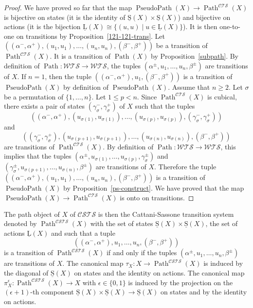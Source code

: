 \documentclass[a4paper,12pt]{amsart}
\begin{document}
\begin{proof}
We have proved so far that the map $\operatorname{{PseudoPath}}(X) \to \operatorname{{Path}}^{\mathcal{C\!T\!S}}(X)$ is
bijective on states (it is the identity of $\operatorname{\underline{S}}(X)\times \operatorname{\underline{S}}(X)$) and
bijective on actions (it is the bijection $\operatorname{\underline{L}}(X) {\cong} \{(u,u)\mid
u\in \operatorname{\underline{L}}(X)\}$). It is then one-to-one on transitions by
Proposition~\ref{121-121-trans}.  Let
$((\alpha^-,\alpha^+),(u_1,u_1),\dots,(u_n,u_n),(\beta^-,\beta^+))$ be
a transition of $\operatorname{{Path}}^{\mathcal{C\!T\!S}}(X)$. It is a transition of $\operatorname{{Path}}(X)$ by
Proposition~\ref{subpath}. By definition of $\operatorname{{Path}}:{\mathcal{W\!T\!S}} \to {\mathcal{W\!T\!S}}$,
the tuples $(\alpha^\pm,u_1,\dots,u_n,\beta^\pm)$ are transitions of
$X$. If $n=1$, then the tuple
$((\alpha^-,\alpha^+),u_1,(\beta^-,\beta^+))$ is a transition of
$\operatorname{{PseudoPath}}(X)$ by definition of $\operatorname{{PseudoPath}}(X)$. Assume that $n{\geqslant} 2$.
Let $\sigma$ be a permutation of $\{1,\dots,n\}$. Let $1{\leqslant} p <n$.
Since $\operatorname{{Path}}^{\mathcal{C\!T\!S}}(X)$ is cubical, there exists a pair of states
$(\gamma_\sigma^-,\gamma_\sigma^+)$ of $X$ such that the tuples
\[
((\alpha^-,\alpha^+),(u_{\sigma(1)},u_{\sigma(1)}),\dots,(u_{\sigma(p)},u_{\sigma(p)}),(\gamma_\sigma^-,\gamma_\sigma^+))\]
and 
\[
((\gamma_\sigma^-,\gamma_\sigma^+),(u_{\sigma(p+1)},u_{\sigma(p+1)}),\dots,(u_{\sigma(n)},u_{\sigma(n)}),(\beta^-,\beta^+))\]
are transitions of $\operatorname{{Path}}^{\mathcal{C\!T\!S}}(X)$. By definition of $\operatorname{{Path}}:{\mathcal{W\!T\!S}}\to
{\mathcal{W\!T\!S}}$, this implies that the tuples
$(\alpha^\pm,u_{\sigma(1)},\dots,u_{\sigma(p)},\gamma_\sigma^\pm)$ and
$(\gamma_\sigma^\pm,u_{\sigma(p+1)},\dots,u_{\sigma(n)},\beta^\pm)$
are transitions of $X$.  Therefore the tuple
$((\alpha^-,\alpha^+),(u_1,u_1),\dots,(u_n,u_n),(\beta^-,\beta^+))$ is
a transition of $\operatorname{{PseudoPath}}(X)$ by Proposition~\ref{ps-construct}. We
have proved that the map $\operatorname{{PseudoPath}}(X) \to \operatorname{{Path}}^{\mathcal{C\!T\!S}}(X)$ is onto on
transitions.  \end{proof}

The path object of $X$ of ${\mathcal{C\!S\!T\!S}}$ is then the Cattani-Sassone
transition system denoted by $\operatorname{{Path}}^{\mathcal{C\!S\!T\!S}}(X)$ with the set of states
$\operatorname{\underline{S}}(X)\times \operatorname{\underline{S}}(X)$, the set of actions $\operatorname{\underline{L}}(X)$ and such that a tuple
\[((\alpha^-,\alpha^+),u_1,\dots,u_n,(\beta^-,\beta^+))\] is a
transition of $\operatorname{{Path}}^{\mathcal{C\!S\!T\!S}}(X)$ if and only if the tuples
$(\alpha^\pm,u_1,\dots,u_n,\beta^\pm)$ are transitions of $X$. The
canonical map $\tau_X:X \to \operatorname{{Path}}^{\mathcal{C\!S\!T\!S}}(X)$ is induced by the
diagonal of $\operatorname{\underline{S}}(X)$ on states and the identity on actions. The
canonical map $\pi_X^\epsilon: \operatorname{{Path}}^{\mathcal{C\!S\!T\!S}}(X) \to X$ with $\epsilon
\in \{0,1\}$ is induced by the projection on the $(\epsilon+1)$-th
component $\operatorname{\underline{S}}(X) \times \operatorname{\underline{S}}(X) \to \operatorname{\underline{S}}(X)$ on states and by the identity
on actions.
\end{document}

